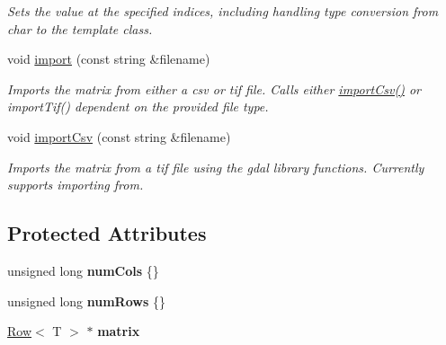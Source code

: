 \begin{DoxyCompactItemize}
\begin{DoxyCompactList}\small\item\em Sets the value at the specified indices, including handling type conversion from char to the template class. \end{DoxyCompactList}\item 
void \hyperlink{class_matrix_aeff54b3b98211bde4c0cae25af7aaa0c}{import} (const string \&filename)
\begin{DoxyCompactList}\small\item\em Imports the matrix from either a csv or tif file. Calls either \hyperlink{class_matrix_aab2f77cfbdbeffcfe67d63d876581b2e}{import\+Csv()} or import\+Tif() dependent on the provided file type. \end{DoxyCompactList}\item 
void \hyperlink{class_matrix_aab2f77cfbdbeffcfe67d63d876581b2e}{import\+Csv} (const string \&filename)
\begin{DoxyCompactList}\small\item\em Imports the matrix from a tif file using the gdal library functions. Currently supports importing from. \end{DoxyCompactList}\end{DoxyCompactItemize}
\subsection*{Protected Attributes}
\begin{DoxyCompactItemize}
\item 
unsigned long {\bfseries num\+Cols} \{\}\hypertarget{class_matrix_a341aaedcfaac978957087bd0467dc527}{}\label{class_matrix_a341aaedcfaac978957087bd0467dc527}

\item 
unsigned long {\bfseries num\+Rows} \{\}\hypertarget{class_matrix_ac1e96667d48c7845708f978ddd17475d}{}\label{class_matrix_ac1e96667d48c7845708f978ddd17475d}

\item 
\hyperlink{class_row}{Row}$<$ T $>$ $\ast$ {\bfseries matrix}\hypertarget{class_matrix_a7a143ae112112155c9622ba17dc434c7}{}\label{class_matrix_a7a143ae112112155c9622ba17dc434c7}

\end{DoxyCompactItemize}
